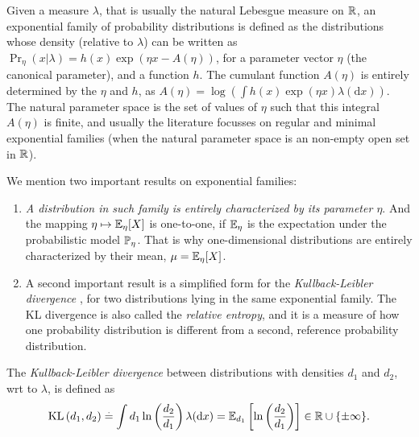 Given a measure $\lambda$, that is usually the natural Lebesgue measure on $\mathbb{R}$, an exponential family of probability distributions is defined as the distributions whose density (relative to $\lambda$) can be written as
$ \Pr_{\eta}(x | \lambda) = h(x) \exp \left( \eta x - A(\eta) \right)$,
for a parameter vector $\eta$ (the canonical parameter),
and a function $h$.
The cumulant function $A(\eta)$ is entirely determined by the $\eta$ and $h$,
as $A(\eta) = \log \left( \int h(x) \exp(\eta x) \lambda(\mathrm{d} x) \right)$.
%
The natural parameter space is the set of values of $\eta$ such that this integral $A(\eta)$ is finite,
and usually the literature focusses on regular and minimal exponential families (when the natural parameter space is an non-empty open set in $\mathbb{R}$).

We mention two important results on exponential families:

\begin{enumerate}
    \item
    \emph{A distribution in such family is entirely characterized by its parameter $\eta$}.
    And the mapping $\eta \mapsto \mathbb{E}_{\eta}[X]$ is one-to-one,
    if $\mathbb{E}_{\eta}$ is the expectation under the probabilistic model $\mathbb{P}_{\eta}$.
    That is why one-dimensional distributions are entirely characterized by their mean, $\mu = \mathbb{E}_{\eta}[X]$.

    \item
    A second important result is a simplified form for the \emph{Kullback-Leibler divergence} \cite{KullbackLeibler51}, for two distributions lying in the same exponential family.
    The KL divergence is also called the \emph{relative entropy},
    and it is a measure of how one probability distribution is different from a second, reference probability distribution.
\end{enumerate}

\begin{definition}\label{def:2:KLDivergence}
\begin{leftbar}[defnbar]  %
    The \emph{Kullback-Leibler divergence} between distributions
    with densities $d_1$ and $d_2$, wrt to $\lambda$, is defined as
    \begin{align}\label{eq:2:Kullback-LeiblerDivergenceExpFamily1}
        \mathrm{KL}\left(d_1, d_2\right) \overset{.}{=} \int d_1 \ln\left(\frac{d_2}{d_1}\right) \lambda(\mathrm{d}x) = \mathbb{E}_{d_1} \left[ \ln\left(\frac{d_2}{d_1}\right) \right] \in \mathbb{R}\cup\{\pm\infty\}.
    \end{align}
\end{leftbar}  %
\end{definition}

